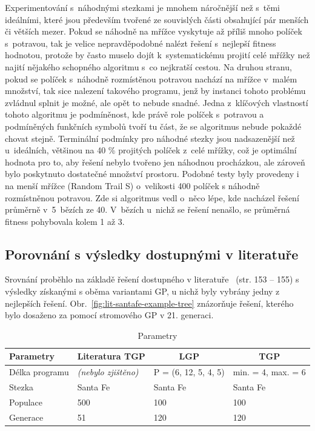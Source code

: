 Experimentování s~náhodnými stezkami je mnohem náročnější než s~těmi ideálními, které jsou především tvořené ze souvislých části obsahující pár menších či větších mezer. Pokud se náhodně na mřížce vyskytuje až příliš mnoho políček s~potravou, tak je velice nepravděpodobné nalézt řešení s~nejlepší fitness hodnotou, protože by často muselo dojít k~systematickému projití celé mřížky než najití nějakého schopného algoritmu s~co nejkratší cestou. Na druhou stranu, pokud se políček s~náhodně rozmístěnou potravou nachází na mřížce v~malém množství, tak sice nalezení takového programu, jenž by instanci tohoto problému zvládnul splnit je možné, ale opět to nebude snadné. Jedna z~klíčových vlastností tohoto algoritmu je podmíněnost, kde právě role políček s~potravou a podmíněných funkčních symbolů tvoří tu část, že se algoritmus nebude pokaždé chovat stejně. Terminální podmínky pro náhodné stezky jsou nadsazenější než u~ideálních, většinou na 40 \% projitých políček z~celé mřížky, což je optimální hodnota pro to, aby řešení nebylo tvořeno jen náhodnou procházkou, ale zároveň bylo poskytnuto dostatečné množství prostoru. Podobné testy byly provedeny i na menší mřížce (Random Trail S) o~velikosti 400 políček s náhodně rozmístněnou potravou. Zde si algoritmus vedl o~něco lépe, kde nacházel řešení průměrně v~5~bězích ze 40. V~bězích u~nichž se řešení nenašlo, se průměrná fitness pohybovala kolem 1 až 3.

\subsection{Porovnání s výsledky dostupnými v literatuře} 

Srovnání proběhlo na základě řešení dostupného v literatuře~\cite{Brameier1998} (str. 153 -- 155) s výsledky získanými s oběma variantami GP, u nichž byly vybrány jedny z nejlepších řešení. Obr.~\ref{fig:lit-santafe-example-tree} znázorňuje řešení, kterého bylo dosaženo za pomocí stromového GP v 21. generaci.

\begin{table}[h!]
\centering
\begin{tabular}{llll}
\hline
Parametry      & \multicolumn{1}{c}{Literatura TGP} & \multicolumn{1}{c}{LGP} & \multicolumn{1}{c}{TGP} \\ \hline
Délka programu & \emph{(nebylo zjištěno)}             & P = (6, 12,  5,  4,  5) & min. = 4, max. = 6 \\
Stezka         &  Santa Fe                          &  Santa Fe  &  Santa Fe                        \\ 
Populace       & 500                                & 100                     & 100   \\
Generace       & 51                                 & 120                     & 120   \\ \hline
\end{tabular}
\caption{Parametry}
\end{table}

